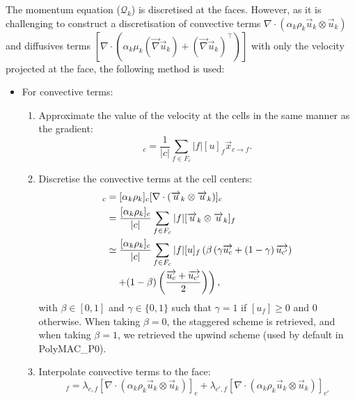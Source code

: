 The momentum equation ($\mathcal{Q}_k$) is discretised at the faces. However, as it is challenging to construct a discretisation of convective terms $\nabla \cdot (\alpha _k \rho _k \vec{u}_k \otimes \vec{u}_k)$ and diffusives terms $[\nabla \cdot (\alpha_k \mu _k (\vec{\nabla} \vec{u}_k) + (\vec{\nabla} \vec{u}_k)^\intercal) ]$ with only the velocity projected at the face, the following method is used:
\begin{itemize}
\item For convective terms:
  \begin{enumerate}
  \item Approximate the value of the velocity at the cells in the same manner as the gradient:
    \begin{equation}
      [\vec{u}]_c = \frac{1}{|c|} \sum _{f \in F_c} |f| [u]_f \vec{x}_{c \rightarrow f}.
    \end{equation}
  \item Discretise the convective terms at the cell centers:
    \begin{align}
      [\nabla \cdot ( \alpha _k \rho _k \vec{u}_k \otimes \vec{u}_k)]_c &= [\alpha _k \rho _k]_c [\nabla \cdot ( \vec{u}_k \otimes \vec{u}_k)]_c \\
                                                                        &= \frac{[\alpha _k \rho _k]_c}{|c|} \sum _{f \in F_c} |f| [\vec{u}_k \otimes \vec{u}_k]_f \\
                                                                        &\simeq \frac{[\alpha _k \rho _k]_c}{|c|} \sum _{f \in F_c} |f| [u]_f \left( \beta \left( \gamma \vec{u_c} + \left(1-\gamma \right) \vec{u_{c'}} \right) \right. \notag \\ & \quad \left. + (1-\beta) \left( \frac{\vec{u_c} +\vec{u_{c'}}}{2} \right) \right),
    \end{align}
    with $\beta \in [0,1]$ and $\gamma \in \{0,1\}$ such that $\gamma =1$ if $[u_f]\geq 0$ and $0$ otherwise. When taking $\beta =0$, the staggered scheme is retrieved, and when taking $\beta =1$, we retrieved the upwind scheme (used by default in PolyMAC\_P0).
  \item Interpolate convective terms to the face:
    \begin{equation}
      [\nabla \cdot (\alpha _k \rho _k \vec{u}_k \otimes \vec{u}_k)]_f = \lambda_{c,f} [\nabla \cdot (\alpha _k \rho _k \vec{u}_k \otimes \vec{u}_k)]_c + \lambda_{c',f} [\nabla \cdot (\alpha _k \rho _k \vec{u}_k \otimes \vec{u}_k)]_{c'}
    \end{equation}

\end{enumerate}
\end{itemize}
